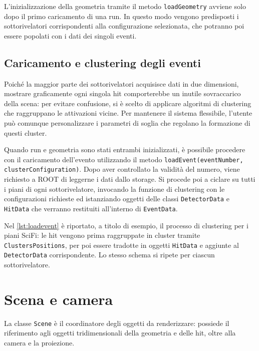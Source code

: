 L'inizializzazione della geometria tramite il metodo \texttt{loadGeometry} avviene solo dopo il primo caricamento di una run.
In questo modo vengono predisposti i sottorivelatori corrispondenti alla configurazione selezionata, che potranno poi essere popolati con i dati dei singoli eventi.

\subsection{Caricamento e clustering degli eventi}
Poiché la maggior parte dei sottorivelatori acquisisce dati in due dimensioni, mostrare graficamente ogni singola hit comporterebbe un inutile sovraccarico della scena: per evitare confusione, si è scelto di applicare algoritmi di clustering che raggruppano le attivazioni vicine.
Per mantenere il sistema flessibile, l'utente può comunque personalizzare i parametri di soglia che regolano la formazione di questi cluster.

Quando run e geometria sono stati entrambi inizializzati, è possibile procedere con il caricamento dell'evento utilizzando il metodo \texttt{loadEvent\allowbreak{}(eventNumber, clusterConfiguration)}.
Dopo aver controllato la validità del numero, viene richiesto a ROOT di leggerne i dati dallo storage.
Si procede poi a ciclare su tutti i piani di ogni sottorivelatore, invocando la funzione di clustering con le configurazioni richieste ed istanziando oggetti delle classi \texttt{DetectorData} e \texttt{HitData} che verranno restituiti all'interno di \texttt{EventData}.

Nel \cref{lst:loadevent} è riportato, a titolo di esempio, il processo di clustering per i piani SciFi: le hit vengono prima raggruppate in cluster tramite \texttt{ClustersPositions}, per poi essere tradotte in oggetti \texttt{HitData} e aggiunte al \texttt{DetectorData} corrispondente.
Lo stesso schema si ripete per ciascun sottorivelatore.



%
%
\section{Scena e camera}
La classe \texttt{Scene} è il coordinatore degli oggetti da renderizzare: possiede il riferimento agli oggetti tridimensionali della geometria e delle hit, oltre alla camera e la proiezione.

